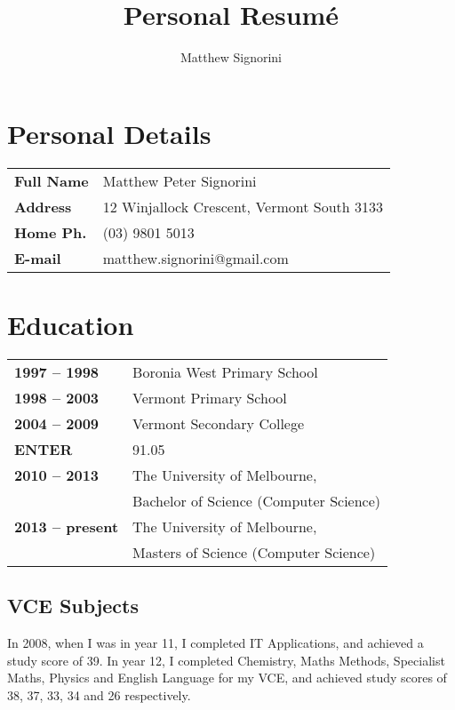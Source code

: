 \documentclass[a4paper]{article}
\title{Personal Resum\'e}
\author{Matthew Signorini}
\begin{document}
\maketitle

\section{Personal Details}
\begin{tabular}{>{\raggedright}m{3cm} l}
    \textbf{Full Name} &Matthew Peter Signorini\\
 \textbf{Address} &12 Winjallock Crescent, Vermont South 3133\\
\textbf{Home Ph.} &(03) 9801 5013\\
  \textbf{E-mail} &matthew.signorini@gmail.com\\
\end{tabular}


\section{Education}
\begin{tabular}{>{\raggedright}m{3cm} l}
    \textbf{1997 -- 1998} &Boronia West Primary School\\
    \textbf{1998 -- 2003} &Vermont Primary School\\
    \textbf{2004 -- 2009} &Vermont Secondary College\\
           \textbf{ENTER} &91.05\\
    \textbf{2010 -- 2013} &The University of Melbourne, \\
                             &Bachelor of Science (Computer Science)\\
    \textbf{2013 -- present} &The University of Melbourne, \\
                             &Masters of Science (Computer Science)\\
\end{tabular}

\subsection{VCE Subjects}
In 2008, when I was in year 11, I completed IT Applications, and achieved a 
study score of 39. In year 12, I completed Chemistry, Maths Methods,
Specialist Maths, Physics and English Language for my VCE, and achieved 
study scores of 38, 37, 33, 34 and 26 respectively.
\end{document}
